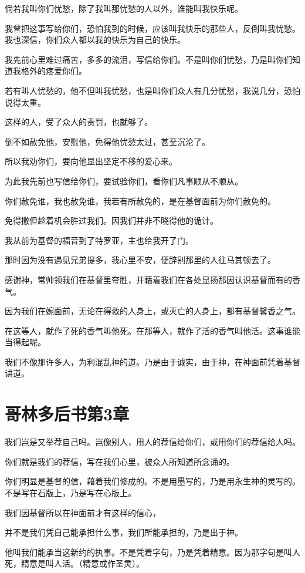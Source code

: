 \documentclass[12pt,oneside]{book}
\begin{document}
倘若我叫你们忧愁，除了我叫那忧愁的人以外，谁能叫我快乐呢。

我曾把这事写给你们，恐怕我到的时候，应该叫我快乐的那些人，反倒叫我忧愁。我也深信，你们众人都以我的快乐为自己的快乐。

我先前心里难过痛苦，多多的流泪，写信给你们。不是叫你们忧愁，乃是叫你们知道我格外的疼爱你们。

若有叫人忧愁的，他不但叫我忧愁，也是叫你们众人有几分忧愁，我说几分，恐怕说得太重。

这样的人，受了众人的责罚，也就够了。

倒不如赦免他，安慰他，免得他忧愁太过，甚至沉沦了。

所以我劝你们，要向他显出坚定不移的爱心来。

为此我先前也写信给你们，要试验你们，看你们凡事顺从不顺从。

你们赦免谁，我也赦免谁，我若有所赦免的，是在基督面前为你们赦免的。

免得撒但趁着机会胜过我们。因我们并非不晓得他的诡计。

我从前为基督的福音到了特罗亚，主也给我开了门。

那时因为没有遇见兄弟提多，我心里不安，便辞别那里的人往马其顿去了。

感谢神，常帅领我们在基督里夸胜，并藉着我们在各处显扬那因认识基督而有的香气。

因为我们在婉面前，无论在得救的人身上，或灭亡的人身上，都有基督馨香之气。

在这等人，就作了死的香气叫他死。在那等人，就作了活的香气叫他活。这事谁能当得起呢。

我们不像那许多人，为利混乱神的道。乃是由于诚实，由于神，在神面前凭着基督讲道。

\chapter{哥林多后书第3章}
我们岂是又举荐自己吗。岂像别人，用人的荐信给你们，或用你们的荐信给人吗。

你们就是我们的荐信，写在我们心里，被众人所知道所念诵的。

你们明显是基督的信，藉着我们修成的。不是用墨写的，乃是用永生神的灵写的。不是写在石版上，乃是写在心版上。

我们因基督所以在神面前才有这样的信心，

并不是我们凭自己能承担什么事，我们所能承担的，乃是出于神。

他叫我们能承当这新约的执事。不是凭着字句，乃是凭着精意。因为那字句是叫人死，精意是叫人活。（精意或作圣灵）。
\end{document}
